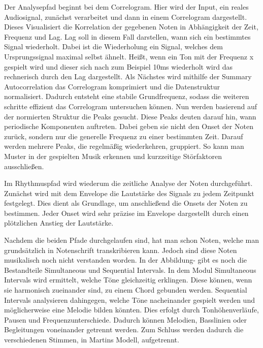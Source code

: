 Der Analysepfad beginnt bei dem Correlogram.
Hier wird der Input, ein reales Audiosignal,
zunächst verarbeitet und dann in einem Correlogram dargestellt.
Dieses Visualisiert die Korrelation der gegebenen Noten in Abhängigkeit der Zeit, Frequenz und Lag.
Lag soll in diesem Fall darstellen, wann sich ein bestimmtes Signal wiederholt.
Dabei ist die Wiederholung ein Signal, welches dem Ursprungssignal maximal selbst ähnelt.
Heißt, wenn ein Ton mit der Frequenz x gespielt wird
und dieser sich nach zum Beispiel 10ms wiederholt wird das rechnerisch durch den Lag dargestellt.
Als Nächstes wird mithilfe der Summary Autocorrelation das Correlogram komprimiert
und die Datenstruktur normalisiert.
Dadurch entsteht eine stabile Grundfrequenz,
sodass die weiteren schritte effizient das Correlogram untersuchen können.
Nun werden basierend auf der normierten Struktur die Peaks gesucht.
Diese Peaks deuten darauf hin, wann periodische Komponenten auftreten.
Dabei geben sie nicht den Onset der Noten zurück, sondern nur die generelle Frequenz zu einer bestimmten Zeit.
Darauf werden mehrere Peaks, die regelmäßig wiederkehren, gruppiert.
So kann man Muster in der gespielten Musik erkennen und kurzzeitige Störfaktoren ausschließen.

Im Rhythmuspfad wird wiederum die zeitliche Analyse der Noten durchgeführt.
Zunächst wird mit dem Envelope die Lautstärke des Signals zu jedem Zeitpunkt festgelegt.
Dies dient als Grundlage, um anschließend die Onsets der Noten zu bestimmen.
Jeder Onset wird sehr präzise im Envelope dargestellt durch einen plötzlichen Anstieg der Lautstärke.

Nachdem die beiden Pfade durchgelaufen sind, hat man schon Noten,
welche man grundsätzlich in Notenschrift transkribieren kann.
Jedoch sind diese Noten musikalisch noch nicht verstanden worden.
In der Abbildung- gibt es noch die Bestandteile Simultaneous und Sequential Intervals.
In dem Modul Simultaneous Intervals wird ermittelt, welche Töne gleichzeitig erklingen.
Diese können, wenn sie harmonisch zueinander sind, zu einem Chord gebunden werden.
Sequential Intervals analysieren dahingegen, welche Töne nacheinander gespielt werden und
möglicherweise eine Melodie bilden könnten.
Dies erfolgt durch Tonhöhenverläufe, Pausen und Frequenzunterschiede.
Dadurch können Melodien, Basslinien oder Begleitungen voneinander getrennt werden.
Zum Schluss werden dadurch die verschiedenen Stimmen, in Martins Modell, aufgetrennt.

